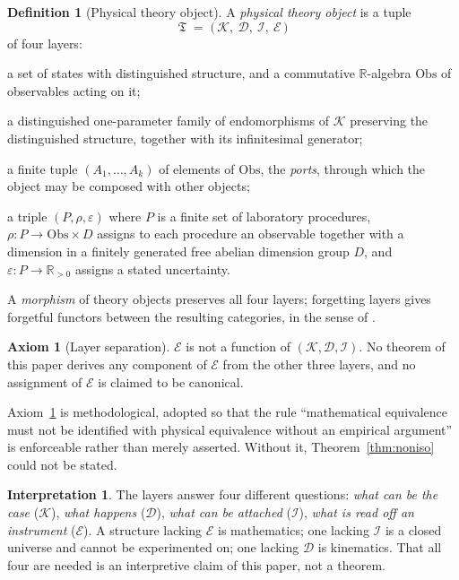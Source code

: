 \documentclass[10pt,a4paper]{article}
\theoremstyle{plain}
\theoremstyle{definition}
\newtheorem{definition}[theorem]{Definition}
\newtheorem{axiom}[theorem]{Axiom}
\newtheorem{interpretation}[theorem]{Interpretation}
\newcommand{\Obs}{\mathrm{Obs}}
\newcommand{\R}{\mathbb{R}}
\begin{document}
\begin{definition}[Physical theory object]
\label{def:object}
A \emph{physical theory object} is a tuple
\[
\mathfrak{T} \;=\; \big(\, \mathcal{K},\ \mathcal{D},\ \mathcal{I},\ \mathcal{E} \,\big)
\]
of four layers:
\begin{description}[leftmargin=1.4em,itemsep=1pt]
\item[$\mathcal{K}$ (kinematic layer)] a set of states with distinguished structure, and a commutative $\R$-algebra $\Obs$ of observables acting on it;
\item[$\mathcal{D}$ (dynamical layer)] a distinguished one-parameter family of endomorphisms of $\mathcal{K}$ preserving the distinguished structure, together with its infinitesimal generator;
\item[$\mathcal{I}$ (interface layer)] a finite tuple $(A_1,\dots,A_k)$ of elements of $\Obs$, the \emph{ports}, through which the object may be composed with other objects;
\item[$\mathcal{E}$ (empirical interpretation layer)] a triple $(P,\rho,\varepsilon)$ where $P$ is a finite set of laboratory procedures, $\rho: P \to \Obs \times D$ assigns to each procedure an observable together with a dimension in a finitely generated free abelian dimension group $D$, and $\varepsilon: P \to \R_{>0}$ assigns a stated uncertainty.
\end{description}
A \emph{morphism} of theory objects preserves all four layers; forgetting layers gives forgetful functors between the resulting categories, in the sense of \cite[Ch.~IV]{MacLane1998}.
\end{definition}

\begin{axiom}[Layer separation]
\label{ax:sep}
$\mathcal{E}$ is not a function of $(\mathcal{K},\mathcal{D},\mathcal{I})$. No theorem of this paper derives any component of $\mathcal{E}$ from the other three layers, and no assignment of $\mathcal{E}$ is claimed to be canonical.
\end{axiom}

Axiom~\ref{ax:sep} is methodological, adopted so that the rule ``mathematical equivalence must not be identified with physical equivalence without an empirical argument'' is enforceable rather than merely asserted. Without it, Theorem~\ref{thm:noniso} could not be stated.

\begin{interpretation}
\label{int:whyfour}
The layers answer four different questions: \emph{what can be the case} ($\mathcal{K}$), \emph{what happens} ($\mathcal{D}$), \emph{what can be attached} ($\mathcal{I}$), \emph{what is read off an instrument} ($\mathcal{E}$). A structure lacking $\mathcal{E}$ is mathematics; one lacking $\mathcal{I}$ is a closed universe and cannot be experimented on; one lacking $\mathcal{D}$ is kinematics. That all four are needed is an interpretive claim of this paper, not a theorem.
\end{interpretation}
\end{document}
